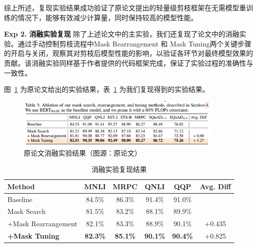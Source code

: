 \documentclass[UTF8,openany]{ctexbook}
\begin{document}
综上所述，复现实验结果成功验证了原论文提出的轻量级剪枝框架在无需模型重训练的情况下，能够有效减少计算量，同时保持较高的模型性能。

\noindent\textbf{Exp 2. 消融实验复现 } 除了上述论文中的主实验，我们还复现了论文中的消融实验。通过手动控制剪枝流程中Mask Rearrangement 和 Mask Tuning两个关键步骤的开启与关闭，观察其对剪枝后模型性能的影响，以验证各环节对最终模型效果的贡献。该消融实验同样基于作者提供的代码框架完成，保证了实验过程的准确性与一致性。

图~\ref{fig:ablation_original} 为原论文给出的实验结果，表~\ref{tab:ablation_results} 为我们复现得到的实验结果。

\begin{figure}[H]
    \centering
    \includegraphics[width=0.9\textwidth]{img/yunlunwenxiao.png}
    \caption{原论文消融实验结果（图源：原论文）}
    \label{fig:ablation_original}
\end{figure}

\begin{table}[H]
    \centering
    \begin{tabular}{lcccc|c}
        \toprule
        Method & MNLI & MRPC & QNLI & QQP & Avg. Diff \\
        \midrule
        Baseline & 84.5\% & 86.3\% & 91.4\% & 91.0\% \\
        \cmidrule(lr){1-5}
        Mask Search & 81.5\% & 83.2\% & 88.1\% & 89.9\% \\
        +Mask Rearrangement & 82.1\% & 83.3\% & 88.9\% & 90.1\% & +0.435 \\
        \textbf{+Mask Tuning} & \textbf{82.3\%} & \textbf{85.1\%} & \textbf{90.1\%} & \textbf{90.4\%} & +0.825 \\
        \bottomrule
    \end{tabular}
    \caption{消融实验复现结果}
    \label{tab:ablation_results}
\end{table}


\end{document}
